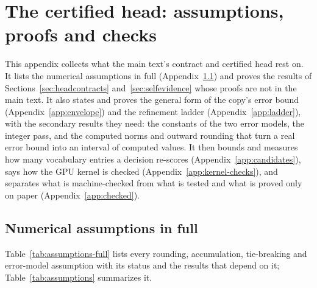 \section{The certified head: assumptions, proofs and checks}\label{app:proofs}\label{app:derivations}
This appendix collects what the main text's contract and certified head rest on. It lists the numerical assumptions in full (Appendix~\ref{app:assumptions}) and proves the results of Sections~\ref{sec:headcontracts} and~\ref{sec:selfevidence} whose proofs are not in the main text. It also states and proves the general form of the copy's error bound (Appendix~\ref{app:envelope}) and the refinement ladder (Appendix~\ref{app:ladder}), with the secondary results they need: the constants of the two error models, the integer pass, and the computed norms and outward rounding that turn a real error bound into an interval of computed values. It then bounds and measures how many vocabulary entries a decision re-scores (Appendix~\ref{app:candidates}), says how the GPU kernel is checked (Appendix~\ref{app:kernel-checks}), and separates what is machine-checked from what is tested and what is proved only on paper (Appendix~\ref{app:checked}).

\subsection{Numerical assumptions in full}\label{app:assumptions}
Table~\ref{tab:assumptions-full} lists every rounding, accumulation, tie-breaking and error-model assumption with its status and the results that depend on it; Table~\ref{tab:assumptions} summarizes it.

